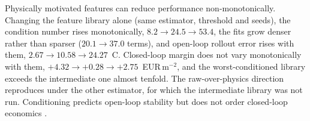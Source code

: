 Physically motivated features can reduce performance non-monotonically.
Changing the feature library alone (same estimator, threshold and seeds), the
condition number rises monotonically, $8.2 \rightarrow 24.5 \rightarrow 53.4$, the fits grow
denser rather than sparser ($20.1 \rightarrow 37.0$ terms), and open-loop
rollout error rises with them, $2.67 \rightarrow 10.58 \rightarrow
24.27$~\textdegree C. Closed-loop margin does not vary monotonically with them,
$+4.32 \rightarrow +0.28 \rightarrow +2.75$~EUR\,m$^{-2}$, and the
worst-conditioned library exceeds the intermediate one almost tenfold. The
raw-over-physics direction reproduces under the other estimator, for which the
intermediate library was not run.
Conditioning predicts open-loop stability but does not order closed-loop
economics \cite{cortiella2021,balanceguided2026,belsley1980}.

